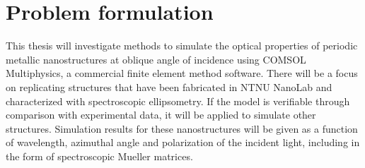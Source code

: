 \section{Problem formulation}
This thesis will investigate methods to simulate the optical properties of periodic metallic nanostructures at oblique angle of incidence using COMSOL Multiphysics, a commercial finite element method software. There will be a focus on replicating structures that have been fabricated in NTNU NanoLab and characterized with spectroscopic ellipsometry. If the model is verifiable through comparison with experimental data, it will be applied to simulate other structures. Simulation results for these nanostructures will be given as a function of wavelength, azimuthal angle and polarization of the incident light, including in the form of spectroscopic Mueller matrices.








